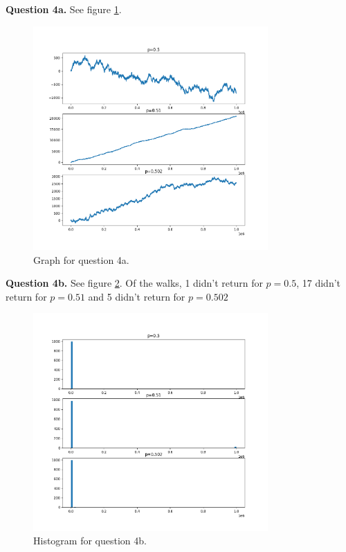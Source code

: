 \documentclass[letterpaper, reqno,11pt]{article}
\begin{document}
{\medskip\noindent\bf Question 4a.} See figure \ref{fig:4a}. 

\begin{figure}[htpb]
    \centering
    \includegraphics[width=0.8\textwidth]{4a}
    \caption{Graph for question 4a.}
    \label{fig:4a}
\end{figure}

{\medskip\noindent\bf Question 4b.} See figure \ref{fig:4b}. Of the walks, 1 didn't return for $p=0.5$, 17 didn't return for $p=0.51$ and 5 didn't return for $p=0.502$

\begin{figure}[htpb]
    \centering
    \includegraphics[width=0.8\textwidth]{4b}
    \caption{Histogram for question 4b.}
    \label{fig:4b}
\end{figure}
\end{document}
